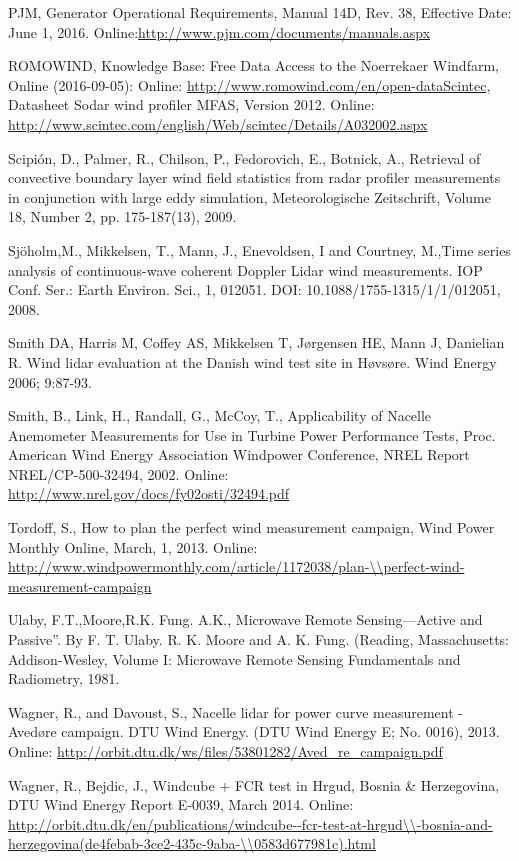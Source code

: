 PJM, Generator Operational Requirements, Manual 14D, Rev. 38, Effective Date: June 1, 2016. 	Online:\small{\url{http://www.pjm.com/documents/manuals.aspx}}


ROMOWIND, Knowledge Base: Free Data Access to the Noerrekaer Windfarm, Online (2016-09-05): Online: \url{http://www.romowind.com/en/open-dataScintec}, Datasheet Sodar wind profiler MFAS, Version 2012. 
Online: \url{http://www.scintec.com/english/Web/scintec/Details/A032002.aspx}


Scipi{\'o}n, D., Palmer, R., Chilson, P., Fedorovich, E., Botnick, A., Retrieval of convective boundary layer wind field statistics from radar profiler measurements in conjunction with large eddy simulation, Meteorologische Zeitschrift, Volume 18, Number 2,  pp. 175-187(13), 2009. 


Sj{\"o}holm,M., Mikkelsen, T., Mann, J., Enevoldsen, I and Courtney, M.,Time series analysis of continuous-wave coherent Doppler Lidar wind measurements. IOP Conf. Ser.: Earth Environ. Sci., 1, 012051. DOI: 10.1088/1755-1315/1/1/012051, 2008.


Smith DA, Harris M, Coffey AS, Mikkelsen T, Jørgensen HE, Mann J, Danielian R. Wind lidar evaluation at the Danish wind test site in Høvsøre. Wind Energy 2006; 9:87-93.


Smith, B., Link, H., Randall, G., McCoy, T., Applicability of Nacelle Anemometer Measurements for Use in Turbine Power Performance Tests, Proc. American Wind Energy Association Windpower Conference, NREL Report NREL/CP-500-32494, 2002. Online: \url{http://www.nrel.gov/docs/fy02osti/32494.pdf}


Tordoff, S., How to plan the perfect wind measurement campaign, Wind Power Monthly Online, March, 1, 2013. Online: \url{http://www.windpowermonthly.com/article/1172038/plan-\\perfect-wind-measurement-campaign}


Ulaby, F.T.,Moore,R.K. Fung. A.K., Microwave Remote Sensing—Active and Passive”. By F. T. Ulaby. R. K. Moore and A. K. Fung. (Reading, Massachusetts: Addison-Wesley,  Volume I: Microwave Remote Sensing Fundamentals and Radiometry, 1981.


Wagner, R., and Davoust, S., Nacelle lidar for power curve measurement  - Avedøre campaign. DTU Wind Energy.  (DTU Wind Energy E; No. 0016), 2013. Online: \url{http://orbit.dtu.dk/ws/files/53801282/Aved_re_campaign.pdf}


Wagner, R., Bejdic, J., Windcube + FCR test in Hrgud, Bosnia \& Herzegovina, DTU Wind Energy Report E-0039, March 2014. Online: \small{\url{http://orbit.dtu.dk/en/publications/windcube--fcr-test-at-hrgud\\-bosnia-and-herzegovina(de4febab-3ce2-435c-9aba-\\0583d677981c).html}}


